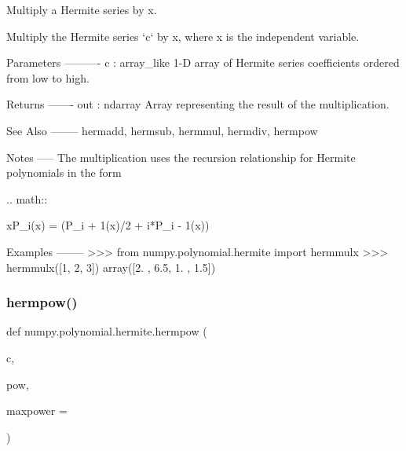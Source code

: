 \begin{DoxyVerb}Multiply a Hermite series by x.

Multiply the Hermite series `c` by x, where x is the independent
variable.


Parameters
----------
c : array_like
    1-D array of Hermite series coefficients ordered from low to
    high.

Returns
-------
out : ndarray
    Array representing the result of the multiplication.

See Also
--------
hermadd, hermsub, hermmul, hermdiv, hermpow

Notes
-----
The multiplication uses the recursion relationship for Hermite
polynomials in the form

.. math::

xP_i(x) = (P_{i + 1}(x)/2 + i*P_{i - 1}(x))

Examples
--------
>>> from numpy.polynomial.hermite import hermmulx
>>> hermmulx([1, 2, 3])
array([2. , 6.5, 1. , 1.5])\end{DoxyVerb}
 \mbox{\label{namespacenumpy_1_1polynomial_1_1hermite_a18a077fe84196b8cf187e30209c89fc6}} 
\subsubsection{\texorpdfstring{hermpow()}{hermpow()}}
{\footnotesize\ttfamily def numpy.\+polynomial.\+hermite.\+hermpow (\begin{DoxyParamCaption}\item[{}]{c,  }\item[{}]{pow,  }\item[{}]{maxpower = {} }\end{DoxyParamCaption})}

